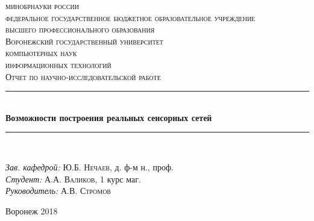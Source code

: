 \begin{titlepage}
\newcommand{\HRule}{\rule{\linewidth}{0.5mm}} %

\center %
 
\textsc {
\footnotesize{
минобрнауки россии\\
федеральное государственное бюджетное образовательное учреждение\\
высшего профессионального образования}\\
\large{Воронежский государственный университет}
}\\[1.0cm] %


\textsc{ компьютерных наук}\\ %
\textsc{ информационных технологий}\\[1.0cm] 
\textsc{\Large Отчет по научно-исследовательской работе}\\[0.5cm] %



\HRule \\[0.4cm]
{ \huge \bfseries Возможности построения реальных сенсорных сетей}\\[0.4cm] %
\HRule \\[1.5cm]
 


\begin{flushleft} \large
\emph{Зав. кафедрой:} Ю.Б. \textsc{Нечаев}, д. ф-м н., проф.\\
\emph{Студент:} А.А. \textsc{Валиков}, 1 курс маг. \\ %
\emph{Руководитель:} А.В. \textsc{Стромов} %
\end{flushleft}



\vfill %
\begin{center}
Воронеж 2018
\end{center}
\end{titlepage}

